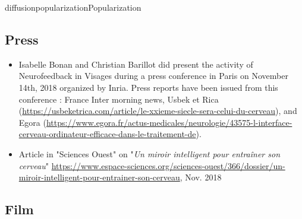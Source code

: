 \documentclass{ra2018}
\begin{document}
\begin{module}{diffusion}{popularization}{Popularization}





\subsection{Press}

\begin{itemize}
	\item Isabelle Bonan and Christian Barillot did present the activity of Neurofeedback in Visages during a press conference in Paris on November 14th, 2018 organized by Inria. Press reports have been issued from this conference : France Inter morning news, Usbek et Rica (\url{https://usbeketrica.com/article/le-xxieme-siecle-sera-celui-du-cerveau}), and Egora (\url{https://www.egora.fr/actus-medicales/neurologie/43575-l-interface-cerveau-ordinateur-efficace-dans-le-traitement-de}).
	\item Article in "Sciences Ouest" on "\emph{Un miroir intelligent pour entraîner son cerveau}" \url{https://www.espace-sciences.org/sciences-ouest/366/dossier/un-miroir-intelligent-pour-entrainer-son-cerveau}, Nov. 2018
\end{itemize}

\subsection{Film}


\end{module}
\end{document}
